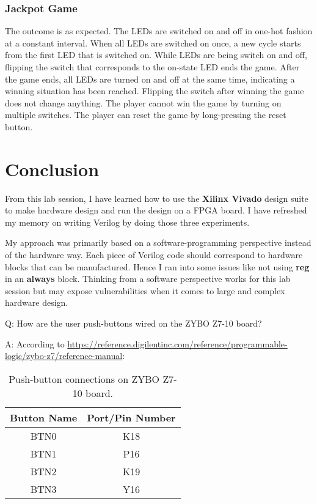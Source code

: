 \documentclass[11pt,letterpaper,titlepage]{article}
\begin{document}
\section{Jackpot Game}


The outcome is as expected. The LEDs are switched on and off in one-hot fashion at a constant interval. When all LEDs are switched on once, a new cycle starts from the first LED that is switched on. While LEDs are being switch on and off, flipping the switch that corresponds to the on-state LED ends the game. After the game ends, all LEDs are turned on and off at the same time, indicating a winning situation has been reached. Flipping the switch after winning the game does not change anything. The player cannot win the game by turning on multiple switches. The player can reset the game by long-pressing the reset button.

\newpage

\part{Conclusion}

From this lab session, I have learned how to use the \textbf{Xilinx Vivado} design suite to make hardware design and run the design on a FPGA board. I have refreshed my memory on writing Verilog by doing those three experiments.

My approach was primarily based on a software-programming perspective instead of the hardware way. Each piece of Verilog code should correspond to hardware blocks that can be manufactured. Hence I ran into some issues like not using \textbf{reg} in an \textbf{always} block. Thinking from a software perspective works for this lab session but may expose vulnerabilities when it comes to large and complex hardware design. 

Q: How are the user push-buttons wired on the ZYBO Z7-10 board?

A: According to \href{https://reference.digilentinc.com/reference/programmable-logic/zybo-z7/reference-manual}{https://reference.digilentinc.com/reference/programmable-logic/zybo-z7/reference-manual}:

\begin{table}[ht]
\centering
\begin{tabular}{@{}cc@{}}
\toprule
Button Name & Port/Pin Number \\ \midrule
BTN0        & K18  \\ \midrule
BTN1        & P16  \\ \midrule
BTN2        & K19  \\ \midrule
BTN3        & Y16  \\ \bottomrule
\end{tabular}
\caption{Push-button connections on ZYBO Z7-10 board.}
\end{table}
\end{document}
